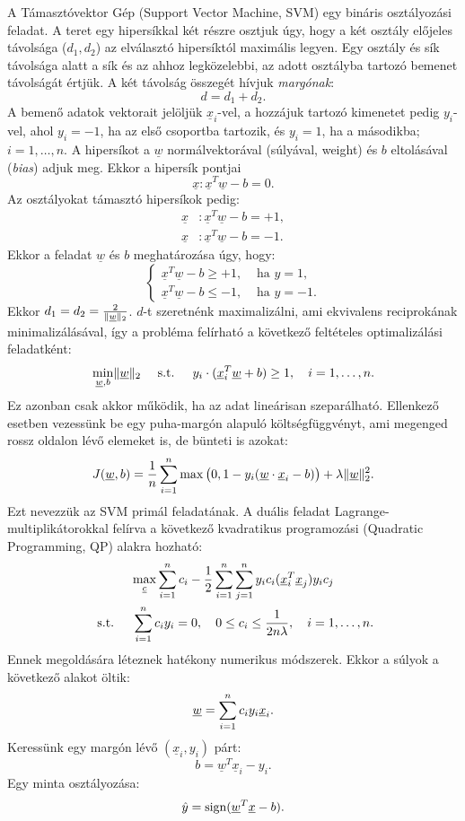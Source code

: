 A Támasztóvektor Gép (Support Vector Machine, SVM) egy bináris osztályozási feladat. 
A teret egy hipersíkkal két részre osztjuk úgy, hogy a két osztály előjeles távolsága ($ d_1, d_2 $) az elválasztó hipersíktól maximális legyen. 
Egy osztály és sík távolsága alatt a sík és az ahhoz legközelebbi, az adott osztályba tartozó bemenet távolságát értjük. 
A két távolság összegét hívjuk \textit{margónak}: 
\[d = d_1 + d_2.\]
A bemenő adatok vektorait jelöljük $ \underline{x}_i $-vel, a hozzájuk tartozó kimenetet
pedig $ y_i $-vel, ahol $ y_i=-1 $, ha az első csoportba tartozik, és $ y_i=1 $, ha a másodikba; $i=1,\dots,n$.
A hipersíkot a $ \underline{w} $ normálvektorával (súlyával, weight) és $ b $ eltolásával (\textit{bias}) adjuk meg.
Ekkor a hipersík pontjai 
\[\underline{x}: \underline{x}^T \underline{w} - b = 0.\]
Az osztályokat támasztó hipersíkok pedig:
\begin{align*}
\underline{x}&\colon \underline{x}^T \underline{w} - b = +1, \\
\underline{x}&\colon \underline{x}^T \underline{w} - b = -1.
\end{align*}
Ekkor a feladat $ \underline{w} $ és $ b $ meghatározása úgy, hogy:
\[
\begin{cases}
\underline{x}^T \underline{w} - b \geq +1, & \text{ ha }  y=1, \\
\underline{x}^T \underline{w} - b \leq -1, & \text{ ha }  y=-1.
\end{cases}
\]
Ekkor $ d_1 = d_2 = \frac{2}{\lVert\underline{w}\rVert_2} $.  
$ d $-t szeretnénk maximalizálni, ami ekvivalens reciprokának minimalizálásával, így a probléma felírható a következő feltételes optimalizálási feladatként:
\[
\min\limits_{\underline{w}, b} \lVert\underline{w}\rVert_2 \quad\text{ s.t. }\quad y_i \cdot (\underline{x}_i^T \underline{w} + b) \geq 1, \quad i=1,\dots,n.
\]
Ez azonban csak akkor működik, ha az adat lineárisan szeparálható. Ellenkező esetben
vezessünk be egy puha-margón alapuló költségfüggvényt, ami megenged rossz oldalon lévő elemeket is, de bünteti is azokat:
\[
J(\underline{w},b)  = \frac{1}{n} \sum\limits_{i=1}^{n} 
\max\big(0, 1 - y_i(\underline{w} \cdot \underline{x}_i - b)\big) + \lambda \lVert\underline{w}\rVert_2^2.
\]
Ezt nevezzük az SVM primál feladatának. A duális feladat Lagrange-multiplikátorokkal felírva a következő kvadratikus programozási (Quadratic Programming, QP) alakra hozható:
\begin{multline*}
\max\limits_{\underline{c}} \sum\limits_{i=1}^{n}c_i -  
\frac{1}{2}\sum\limits_{{i}=1}^{n}\sum\limits_{{j}=1}^{n} y_i c_i (\underline{x}_i^T \underline{x}_j) y_i c_j \\
\text{ s.t. } \quad 
\sum\limits_{{i}=1}^{n} c_i y_i = 0, \quad
0 \leq c_i \leq \frac{1}{2n\lambda}, \quad 
i=1,\dots,n.
\end{multline*}
Ennek megoldására léteznek hatékony numerikus módszerek.
Ekkor a súlyok a következő alakot öltik:
\[
\underline{w} = \sum\limits_{{i}=1}^{n} c_i y_i \underline{x}_i.
\]
Keressünk egy margón lévő $ (\underline{x}_i, y_i) $ párt:
\[
b = \underline{w}^T \underline{x}_i  - y_i.
\]
Egy minta osztályozása:
\[
\hat{y} = \operatorname{sign}(\underline{w}^T \underline{x} - b).
\]

